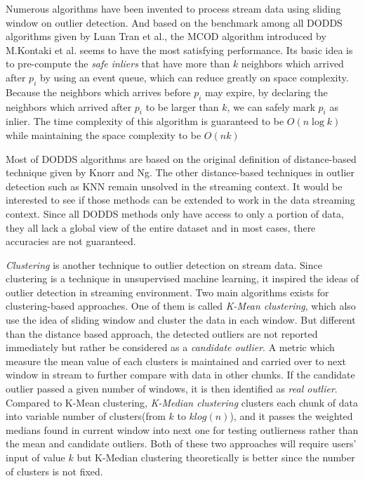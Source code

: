 \documentclass[11pt]{article}       %
\begin{document}
Numerous algorithms have been invented to process stream data using sliding window on outlier detection. And based on the benchmark among all DODDS algorithms given by Luan Tran et al.\cite{Tran:2016:DOD:2994509.2994526}, the MCOD algorithm introduced by M.Kontaki et al.\cite{5767923} seems to have the most satisfying performance. Its basic idea is to pre-compute the \textit{safe inliers} that have more than $k$ neighbors which arrived after $p_{i}$ by using an event queue, which can reduce greatly on space complexity. Because the neighbors which arrives before $p_{i}$ may expire, by declaring the neighbors which arrived after $p_{i}$ to be larger than $k$, we can safely mark $p_{i}$ as inlier. The time complexity of this algorithm is guaranteed to be $O(n\log{k})$ while maintaining the space complexity to be $O(nk)$

Most of DODDS algorithms are based on the original definition of distance-based technique given by Knorr and Ng\cite{EKnorr:1998}. The other distance-based techniques in outlier detection such as KNN remain unsolved in the streaming context. It would be interested to see if those methods can be extended to work in the data streaming context. Since all DODDS methods only have access to only a portion of data, they all lack a global view of the entire dataset and in most cases, there accuracies are not guaranteed. 

\textit{Clustering} is another technique to outlier detection on stream data. Since clustering is a technique in unsupervised machine learning, it inspired the ideas of outlier detection in streaming environment. Two main algorithms exists for clustering-based approaches. One of them is called \textit{K-Mean clustering}\cite{04666541}, which also use the idea of sliding window and cluster the data in each window. But different than the distance based approach, the detected outliers are not reported immediately but rather be considered as a \textit{candidate outlier}. A metric which measure the mean value of each clusters is maintained and carried over to next window in stream to further compare with data in other chunks. If the candidate outlier passed a given number of windows, it is then identified as \textit{real outlier}. Compared to K-Mean clustering, \textit{K-Median clustering}\cite{DBLP:journals/corr/abs-1002-4003} clusters each chunk of data into variable number of clusters(from $k$ to $k log(n)$), and it passes the weighted medians found in current window into next one for testing outlierness rather than the mean and candidate outliers. Both of these two approaches will require users' input of value $k$ but K-Median clustering theoretically is better since the number of clusters is not fixed. 
\end{document}
